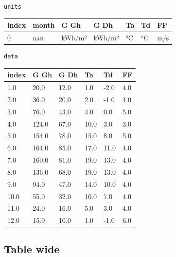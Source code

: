 \documentclass[reprint, floatfix, groupaddress, prb]{article}
\begin{document}
    \begin{Verbatim}[commandchars=\\\{\}]
units
    \end{Verbatim}

    
        
    \begin{table}[ht] 
\begin{tabular}[l]{lllllll}
\toprule
index & month & G Gh & G Dh & Ta & Td & FF\\ 
\midrule
0 & nan & kWh/m² & kWh/m² & °C & °C & m/s\\ 
\bottomrule 
 \end{tabular}
\end{table}

    
    

    \begin{Verbatim}[commandchars=\\\{\}]
data
    \end{Verbatim}

    
        
    \begin{table}[ht] 
\begin{tabular}[l]{llllll}
\toprule
index & G Gh & G Dh & Ta & Td & FF\\ 
\midrule
1.0 & 20.0 & 12.0 & 1.0 & -2.0 & 4.0\\ 
2.0 & 36.0 & 20.0 & 2.0 & -1.0 & 4.0\\ 
3.0 & 76.0 & 43.0 & 4.0 & 0.0 & 5.0\\ 
4.0 & 124.0 & 67.0 & 10.0 & 3.0 & 3.0\\ 
5.0 & 154.0 & 78.0 & 15.0 & 8.0 & 5.0\\ 
6.0 & 164.0 & 85.0 & 17.0 & 11.0 & 4.0\\ 
7.0 & 160.0 & 81.0 & 19.0 & 13.0 & 4.0\\ 
8.0 & 136.0 & 68.0 & 19.0 & 13.0 & 4.0\\ 
9.0 & 94.0 & 47.0 & 14.0 & 10.0 & 4.0\\ 
10.0 & 55.0 & 32.0 & 10.0 & 7.0 & 4.0\\ 
11.0 & 24.0 & 16.0 & 5.0 & 3.0 & 4.0\\ 
12.0 & 15.0 & 10.0 & 1.0 & -1.0 & 6.0\\ 
\bottomrule 
 \end{tabular}
\end{table}

    
    

    \hypertarget{table-wide}{%
\subsection{Table wide}\label{table-wide}}
\end{document}
